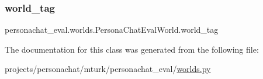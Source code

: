 \mbox{\label{classpersonachat__eval_1_1worlds_1_1PersonaChatEvalWorld_a47e3c2213ce2f77d7aafe62aaf771328}} 
\subsubsection{\texorpdfstring{world\+\_\+tag}{world\_tag}}
{\footnotesize\ttfamily personachat\+\_\+eval.\+worlds.\+Persona\+Chat\+Eval\+World.\+world\+\_\+tag}



The documentation for this class was generated from the following file\+:\begin{DoxyCompactItemize}
\item 
projects/personachat/mturk/personachat\+\_\+eval/\hyperlink{projects_2personachat_2mturk_2personachat__eval_2worlds_8py}{worlds.\+py}\end{DoxyCompactItemize}
